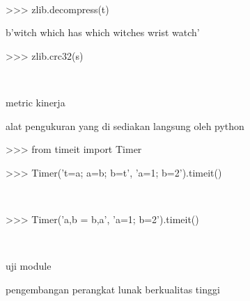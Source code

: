 {\fontsize{14pt}{14pt} \\} \par
\vspace{14pt}
\noindent 
{\fontsize{14pt}{14pt}\selectfont >>> zlib.decompress(t) \\} \par
\noindent 
{\fontsize{14pt}{14pt}\selectfont b'witch which has which witches wrist watch' \\} \par
\vspace{14pt}
\noindent 
{\fontsize{14pt}{14pt}\selectfont >>> zlib.crc32(s) \\} \par
\noindent 
{\fontsize{14pt}{14pt} \\} \par
\vspace{14pt}
\noindent 
{\fontsize{14pt}{14pt}\selectfont metric kinerja \\} \par
\noindent 
{\fontsize{14pt}{14pt}\selectfont alat pengukuran yang di sediakan langsung oleh python \\} \par
\vspace{14pt}
\noindent 
{\fontsize{14pt}{14pt}\selectfont >>> from timeit import Timer \\} \par
\vspace{14pt}
\noindent 
{\fontsize{14pt}{14pt}\selectfont >>> Timer('t=a; a=b; b=t', 'a=1; b=2').timeit() \\} \par
\noindent 
{\fontsize{14pt}{14pt} \\} \par
\vspace{14pt}
\noindent 
{\fontsize{14pt}{14pt}\selectfont >>> Timer('a,b = b,a', 'a=1; b=2').timeit() \\} \par
\noindent 
{\fontsize{14pt}{14pt} \\} \par
\vspace{14pt}
\noindent 
{\fontsize{14pt}{14pt}\selectfont uji module  \\} \par
\noindent 
{\fontsize{14pt}{14pt}\selectfont pengembangan perangkat lunak berkualitas tinggi \\} \par
